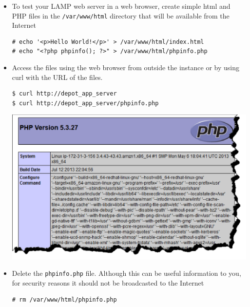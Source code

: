 \documentclass{beamer}
\begin{document}
\begin{frame}
\begin{itemize}
\item To test your LAMP web server in a web browser, create simple html and PHP files in the \texttt{/var/www/html}
directory that will be available from the Internet
\lstset{language=shell}
\begin{lstlisting}[escapechar=&]
# echo '<p>Hello World!</p>' > /var/www/html/index.html
# echo "<?php phpinfo(); ?>" > /var/www/html/phpinfo.php
\end{lstlisting}


\item Access the files using the web browser from outside the instance or by using curl with the URL of the files.
\lstset{language=shell}
\begin{lstlisting}[escapechar=!]
$ curl http://depot_app_server
$ curl http://depot_app_server/phpinfo.php
\end{lstlisting}


\includegraphics[width=0.5 \textwidth]{phpinfo.eps}

\item Delete the \texttt{phpinfo.php} file. Although this can be useful information to you, for security reasons it should not be broadcasted to the Internet

\lstset{language=shell}
\begin{lstlisting}[escapechar=&]
# rm /var/www/html/phpinfo.php
\end{lstlisting}

\end{itemize}
\end{frame}
\end{document}
